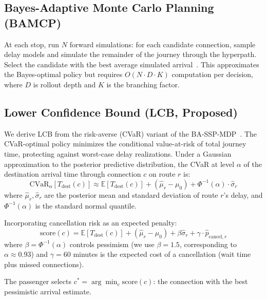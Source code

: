 \documentclass[journal]{IEEEtran}
\begin{document}
\subsection{Bayes-Adaptive Monte Carlo Planning (BAMCP)}
\label{sec:bamcp}

At each stop, run $N$ forward simulations: for each candidate connection, sample delay models and simulate the remainder of the journey through the hyperpath. Select the candidate with the best average simulated arrival~\cite{guez2012}. This approximates the Bayes-optimal policy but requires $O(N \cdot D \cdot K)$ computation per decision, where $D$ is rollout depth and $K$ is the branching factor.

\subsection{Lower Confidence Bound (LCB, Proposed)}
\label{sec:lcb}

We derive LCB from the risk-averse (CVaR) variant of the BA-SSP-MDP~\cite{rigter2021}. The CVaR-optimal policy minimizes the conditional value-at-risk of total journey time, protecting against worst-case delay realizations. Under a Gaussian approximation to the posterior predictive distribution, the CVaR at level $\alpha$ of the destination arrival time through connection $c$ on route $r$ is:
\begin{equation}
    \text{CVaR}_\alpha[T_{\mathrm{dest}}(c)] \approx \mathbb{E}[T_{\mathrm{dest}}(c)] + (\hat{\mu}_r - \mu_0) + \Phi^{-1}(\alpha) \cdot \hat{\sigma}_r
    \label{eq:cvar_approx}
\end{equation}
where $\hat{\mu}_r, \hat{\sigma}_r$ are the posterior mean and standard deviation of route $r$'s delay, and $\Phi^{-1}(\alpha)$ is the standard normal quantile.

Incorporating cancellation risk as an expected penalty:
\begin{equation}
    \text{score}(c) = \mathbb{E}[T_{\mathrm{dest}}(c)] + (\hat{\mu}_r - \mu_0) + \beta \hat{\sigma}_r + \gamma \cdot \hat{p}_{\mathrm{cancel},r}
    \label{eq:lcb}
\end{equation}
where $\beta = \Phi^{-1}(\alpha)$ controls pessimism (we use $\beta = 1.5$, corresponding to $\alpha \approx 0.93$) and $\gamma = 60$ minutes is the expected cost of a cancellation (wait time plus missed connections).

The passenger selects $c^* = \arg\min_c \text{score}(c)$: the connection with the best pessimistic arrival estimate.
\end{document}
